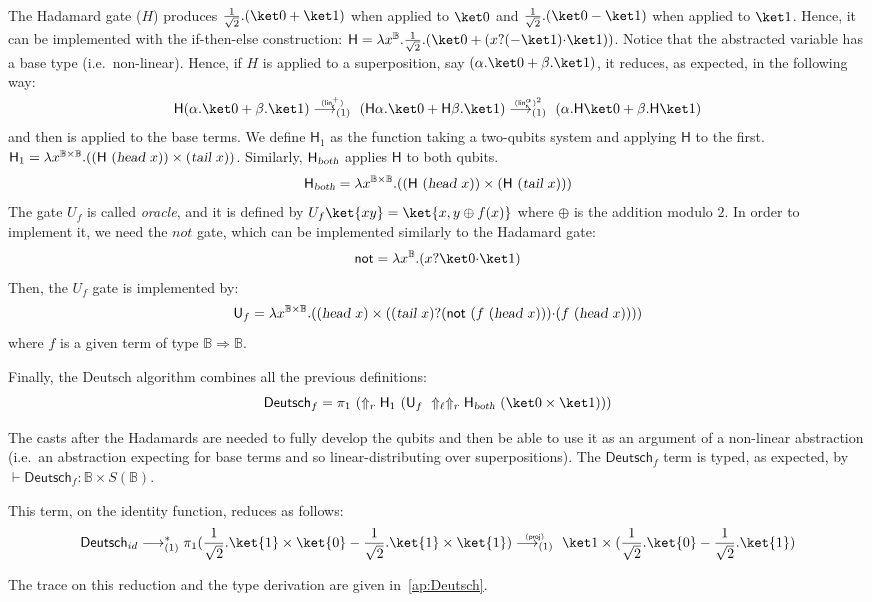 \documentclass[preprint]{elsarticle}
\newcommand\lra[1][1]{\longrightarrow_{\left(#1\right)}}
\newcommand\B{\ensuremath{\mathbb B}}
\newcommand\ite[3]{{#1}?{#2}\mathord{\cdot}{#3}}
\newcommand\pair[2]{({#1}+{#2})}
\newcommand\npair[2]{({#1}-{#2})}
\newcommand\s[1]{\ensuremath{\mathsf{#1}}}
\newcommand\head{\text{\sl head}}
\newcommand\tail{\text{\sl tail}}
\newcommand\red[2][1]{\overset{\scriptscriptstyle\smash{#2}\vphantom{x}}{\lra[#1]}\ }
\newcommand\rlinr{(\s{lin^+_r})}
\newcommand\rlinscalr{(\s{lin^\alpha_r})}
\newcommand\rproj{(\s{proj})}
\begin{document}
The Hadamard gate ($H$) produces $\tfrac 1{\sqrt 2}.\pair{\ket 0}{\ket 1}$ when
applied to $\ket 0$ and $\tfrac 1{\sqrt 2}.\npair{\ket 0}{\ket 1}$ when applied
to $\ket 1$. Hence, it can be implemented with the if-then-else construction:
$\s H =\lambda x^{\B}.\frac 1{\sqrt 2}.\pair{\ket 0}{(\ite x{(-\ket 1)}{\ket
    1})}$. Notice that the abstracted variable has a base type
(i.e.~non-linear). Hence, if $H$ is applied to a superposition, say
$\pair{\alpha.\ket 0}{\beta.\ket 1}$, it reduces, as expected, in the following
way:
\[
  \s H\pair{\alpha.\ket 0}{\beta.\ket 1} \red\rlinr \pair{\s H\alpha.\ket 0}{\s
    H\beta.\ket 1} \red{\rlinscalr^2} \pair{\alpha.\s H\ket 0}{\beta.\s H\ket 1}
\]
and then is applied to the base terms. We define $\s H_1$ as the function taking
a two-qubits system and applying $\s H$ to the first. $\s H_1 =\lambda
x^{\B\times\B}.((\s H~(\head~x))\times(\tail~x))$. Similarly, $\s
H_{\textsl{both}}$ applies $\s H$ to both qubits.
\[\s H_{\textsl{both}} =
  \lambda x^{\B\times\B}.((\s H~(\head~x))\times(\s H~(\tail~x)))\] The gate
$U_f$ is called {\em oracle}, and it is defined by $U_f\ket{xy} = \ket{x,y\oplus
  f(x)}$ where $\oplus$ is the addition modulo $2$. In order to implement it, we
need the $\mathit{not}$ gate, which can be implemented similarly to the Hadamard
gate:
\[
  \s{not}=\lambda x^{\B}.(\ite x{\ket 0}{\ket 1})
\]
Then, the $U_f$ gate is implemented by:
\[
  \s U_f = \lambda x^{\B\times\B}.
  ((\head~x)\times(\ite{(\tail~x)}{(\s{not}~(f~(\head~x)))}{(f~(\head~x))}))
\]
where $f$ is a given term of type $\B\Rightarrow\B$.

Finally, the Deutsch algorithm combines all the previous definitions:
\[\s{Deutsch}_f = \pi_1~(\Uparrow_r \s H_1~(\s
  U_f~\Uparrow_\ell\Uparrow_r \s H_{\textsl{both}}~(\ket 0\times\ket 1)))\]

The casts after the Hadamards are needed to fully develop the qubits and then be
able to use it as an argument of a non-linear abstraction (i.e.~an abstraction
expecting for base terms and so linear-distributing over superpositions). The
$\s{Deutsch}_f$ term is typed, as expected, by $\vdash \s{Deutsch}_f:\B\times
S(\B)$.

This term, on the identity function, reduces as follows:
\[
  \s{Deutsch}_{id} \lra^* \pi_1\npair{\frac 1{\sqrt 2}.\ket{1} \times
    \ket{0}}{\frac 1{\sqrt 2}.\ket{1} \times \ket{1}} \red{\rproj} \ket
  1\times\npair{\frac 1{\sqrt 2}.\ket{0}}{\frac 1{\sqrt 2}.\ket{1}}
\]

The trace on this reduction and the type derivation are given in~\ref{ap:Deutsch}.
\end{document}
